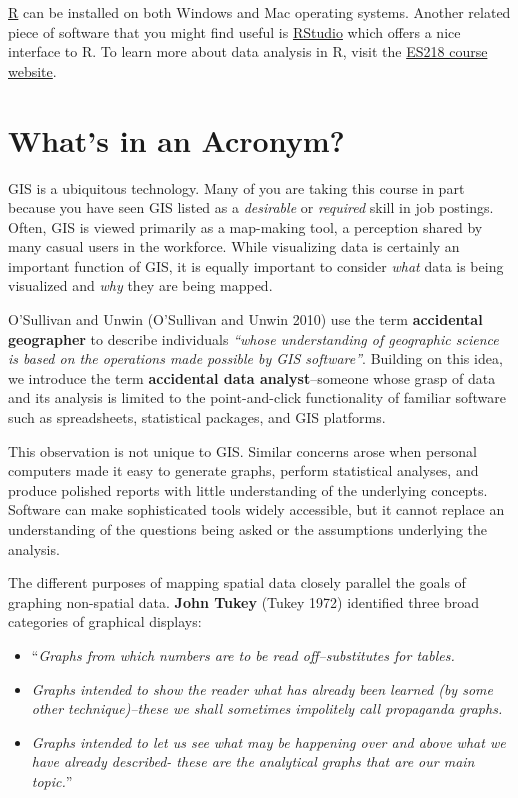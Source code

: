 \documentclass[
  letterpaper,
]{book}
\providecommand{\tightlist}{%
  \setlength{\itemsep}{0pt}\setlength{\parskip}{0pt}}
\begin{document}
\href{http://www.r-project.org/}{R} can be installed on both Windows and
Mac operating systems. Another related piece of software that you might
find useful is
\href{https://posit.co/download/rstudio-desktop/}{RStudio} which offers
a nice interface to R. To learn more about data analysis in R, visit the
\href{http://mgimond.github.io/ES218/}{ES218 course website}.

\section{What's in an Acronym?}\label{whats-in-an-acronym}

GIS is a ubiquitous technology. Many of you are taking this course in
part because you have seen GIS listed as a \emph{desirable} or
\emph{required} skill in job postings. Often, GIS is viewed primarily as
a map-making tool, a perception shared by many casual users in the
workforce. While visualizing data is certainly an important function of
GIS, it is equally important to consider \emph{what} data is being
visualized and \emph{why} they are being mapped.

O'Sullivan and Unwin (O'Sullivan and Unwin 2010) use the term
\textbf{accidental geographer} to describe individuals \emph{``whose
understanding of geographic science is based on the operations made
possible by GIS software''}. Building on this idea, we introduce the
term \textbf{accidental data analyst}--someone whose grasp of data and
its analysis is limited to the point-and-click functionality of familiar
software such as spreadsheets, statistical packages, and GIS platforms.

This observation is not unique to GIS. Similar concerns arose when
personal computers made it easy to generate graphs, perform statistical
analyses, and produce polished reports with little understanding of the
underlying concepts. Software can make sophisticated tools widely
accessible, but it cannot replace an understanding of the questions
being asked or the assumptions underlying the analysis.

The different purposes of mapping spatial data closely parallel the
goals of graphing non-spatial data. \textbf{John Tukey} (Tukey 1972)
identified three broad categories of graphical displays:

\begin{itemize}
\tightlist
\item
  ``\emph{Graphs from which numbers are to be read off--substitutes for
  tables.}
\item
  \emph{Graphs intended to show the reader what has already been learned
  (by some other technique)--these we shall sometimes impolitely call
  propaganda graphs.}
\item
  \emph{Graphs intended to let us see what may be happening over and
  above what we have already described- these are the analytical graphs
  that are our main topic.}''
\end{itemize}
\end{document}
